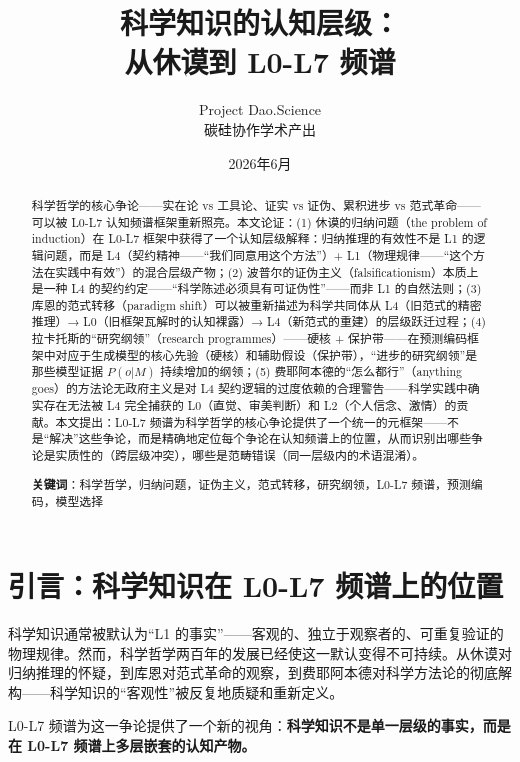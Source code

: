 \documentclass[UTF8,12pt,a4paper]{ctexart}
\title{\textbf{科学知识的认知层级：\\从休谟到 L0-L7 频谱}}
\author{Project Dao.Science\\碳硅协作学术产出}
\date{2026年6月}
\begin{document}
\maketitle

\begin{abstract}
科学哲学的核心争论——实在论 vs 工具论、证实 vs 证伪、累积进步 vs 范式革命——可以被 L0-L7 认知频谱框架重新照亮。本文论证：(1) 休谟的归纳问题（the problem of induction）在 L0-L7 框架中获得了一个认知层级解释：归纳推理的有效性不是 L1 的逻辑问题，而是 L4（契约精神——``我们同意用这个方法''）+ L1（物理规律——``这个方法在实践中有效''）的混合层级产物；(2) 波普尔的证伪主义（falsificationism）本质上是一种 L4 的契约约定——``科学陈述必须具有可证伪性''——而非 L1 的自然法则；(3) 库恩的范式转移（paradigm shift）可以被重新描述为科学共同体从 L4（旧范式的精密推理）→ L0（旧框架瓦解时的认知裸露）→ L4（新范式的重建）的层级跃迁过程；(4) 拉卡托斯的``研究纲领''（research programmes）——硬核 + 保护带——在预测编码框架中对应于生成模型的核心先验（硬核）和辅助假设（保护带），``进步的研究纲领''是那些模型证据 $P(o|M)$ 持续增加的纲领；(5) 费耶阿本德的``怎么都行''（anything goes）的方法论无政府主义是对 L4 契约逻辑的过度依赖的合理警告——科学实践中确实存在无法被 L4 完全捕获的 L0（直觉、审美判断）和 L2（个人信念、激情）的贡献。本文提出：L0-L7 频谱为科学哲学的核心争论提供了一个统一的元框架——不是``解决''这些争论，而是精确地定位每个争论在认知频谱上的位置，从而识别出哪些争论是实质性的（跨层级冲突），哪些是范畴错误（同一层级内的术语混淆）。

\textbf{关键词}：科学哲学，归纳问题，证伪主义，范式转移，研究纲领，L0-L7 频谱，预测编码，模型选择
\end{abstract}

\section{引言：科学知识在 L0-L7 频谱上的位置}

科学知识通常被默认为``L1 的事实''——客观的、独立于观察者的、可重复验证的物理规律。然而，科学哲学两百年的发展已经使这一默认变得不可持续。从休谟对归纳推理的怀疑，到库恩对范式革命的观察，到费耶阿本德对科学方法论的彻底解构——科学知识的``客观性''被反复地质疑和重新定义。

L0-L7 频谱为这一争论提供了一个新的视角：\textbf{科学知识不是单一层级的事实，而是在 L0-L7 频谱上多层嵌套的认知产物。}
\end{document}
